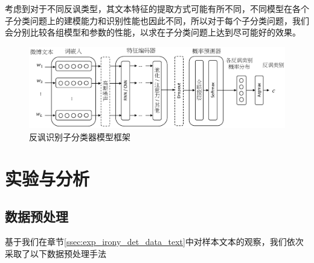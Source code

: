 考虑到对于不同反讽类型，其文本特征的提取方式可能有所不同，不同模型在各个子分类问题上的建模能力和识别性能也因此不同，所以对于每个子分类问题，我们会分别比较各组模型和参数的性能，以求在子分类问题上达到尽可能好的效果。

\begin{figure}[H]
  \centering
  \includegraphics[width=\textwidth]{img/irony_det_cls_framework.pdf}
  \caption{反讽识别子分类器模型框架}
  \label{fig:irony_det_cls_framework}
\end{figure}

\section{实验与分析}
\label{sec:exp_irony_det_exp}

\subsection{数据预处理}

基于我们在章节\ref{ssec:exp_irony_det_data_text}中对样本文本的观察，我们依次采取了以下数据预处理手法

